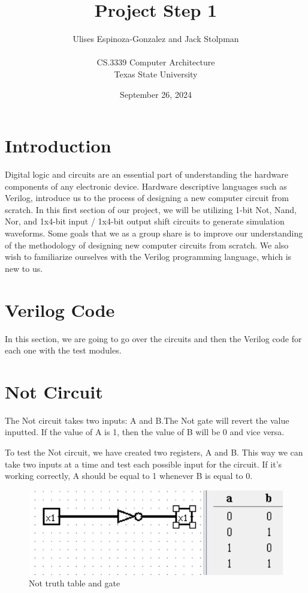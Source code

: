 \documentclass[12pt]{article}
\title{Project Step 1}
\author{Ulises Espinoza-Gonzalez and Jack Stolpman\\
\AND\\
\AND
\AND
\AND
\AND
	CS.3339 Computer Architecture\\
\AND
	Texas State University\\
}
\date{September 26, 2024}
\begin{document}
\maketitle

\newpage
\thispagestyle{empty}


\newpage
\setcounter{page}{1}
\section{Introduction}
Digital logic and circuits are an essential part of understanding the hardware components of any electronic device. Hardware descriptive languages such as Verilog, introduce us to the process of designing a new computer circuit from scratch. In this first section of our project, we will be utilizing 1-bit Not, Nand, Nor, and 1x4-bit input / 1x4-bit output shift circuits to generate simulation waveforms. Some goals that we as a group share is to improve our understanding of the methodology of designing new computer circuits from scratch. We also wish to familiarize ourselves with the Verilog programming language, which is new to us. 

\section{Verilog Code}
\label{sec:headings}

In this section, we are going to go over the circuits and then the Verilog code for each one with the test modules.






\section{Not Circuit}
The Not circuit takes two inputs: A and B.The Not gate will revert the value inputted. If the value of A is 1, then the value of B will be 0 and vice versa.


To test the Not circuit, we have created two registers, A and B. This way we can take two inputs at a time and test each possible input for the circuit. If it's working correctly, A should be equal to 1 whenever B is equal to 0.


\begin{figure}[h]
    \centering
    \includegraphics[width = 1.0\textwidth]{figs/Not CircuitTruth.png}
    \caption{Not truth table and gate}
    \label{fig:enter-label}
\end{figure}
\end{document}
